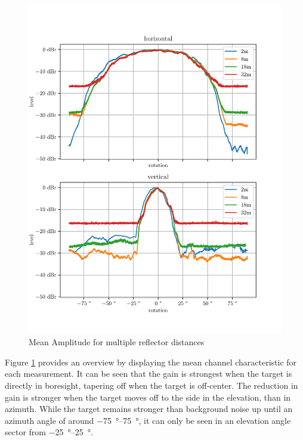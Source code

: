 \begin{figure}
    \centering
    \includegraphics[width=\textwidth]{../figures/mean_amp.pdf}
    \caption{Mean Amplitude for multiple reflector distances}
    \label{fig:mean_amp}
\end{figure}

Figure \ref{fig:mean_amp} provides an overview by displaying the mean channel characteristic for each measurement.
It can be seen that the gain is strongest when the target is directly in boresight,
tapering off when the target is off-center. The reduction in gain is stronger when the target
moves off to the side in the elevation, than in azimuth. While the target remains stronger
than background noise up until an azimuth angle of around \SIrange{-75}{+75}{\degree},
it can only be seen in an elevation angle sector from \SIrange{-25}{+25}{\degree}.

